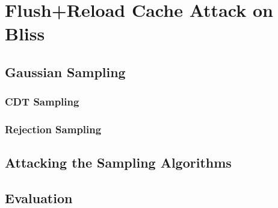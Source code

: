 %
%

\chapter{Flush+Reload Cache Attack on Bliss}
\label{bliss}

\section{Gaussian Sampling} %

\subsection{CDT Sampling}

\subsection{Rejection Sampling}

\section{Attacking the Sampling Algorithms}

\section{Evaluation}